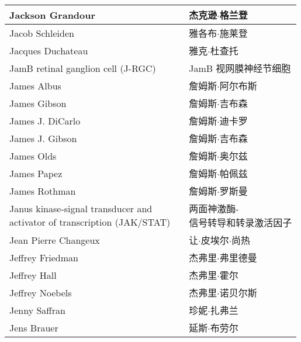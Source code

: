 \begin{longtable}{lll}
	\midrule
	Jackson Grandour   && 杰克逊$\cdot$格兰登  \\
	
	\midrule
	Jacob Schleiden   && 雅各布$\cdot$施莱登  \\
	
	\midrule
	Jacques Duchateau   && 雅克$\cdot$杜查托  \\
	
	\midrule
	JamB retinal ganglion cell (J-RGC)   && JamB 视网膜神经节细胞  \\
	
	\midrule
	James Albus   && 詹姆斯$\cdot$阿尔布斯  \\
	
	\midrule
	James Gibson   && 詹姆斯$\cdot$吉布森  \\
	
	\midrule
	James J. DiCarlo   && 詹姆斯$\cdot$迪卡罗  \\
	
	\midrule
	James J. Gibson   && 詹姆斯$\cdot$吉布森  \\
	
	\midrule
	James Olds   && 詹姆斯$\cdot$奥尔兹  \\
	
	\midrule
	James Papez   && 詹姆斯$\cdot$帕佩兹  \\
	
	\midrule
	James Rothman   && 詹姆斯$\cdot$罗斯曼  \\
	
	\midrule
	\makecell[l]{Janus kinase-signal transducer and \\activator of transcription (JAK/STAT)}  && \makecell[l]{两面神激酶-\\信号转导和转录激活因子}  \\
	
	\midrule
	Jean Pierre Changeux   && 让$\cdot$皮埃尔$\cdot$尚热  \\
	
	\midrule
	Jeffrey Friedman   && 杰弗里$\cdot$弗里德曼  \\
	
	\midrule
	Jeffrey Hall   && 杰弗里$\cdot$霍尔  \\
	
	\midrule
	Jeffrey Noebels   && 杰弗里$\cdot$诺贝尔斯  \\
	
	\midrule
	Jenny Saffran   && 珍妮$\cdot$扎弗兰  \\
	
	\midrule
	Jens Brauer   && 延斯$\cdot$布劳尔  \\
	

\end{longtable}
